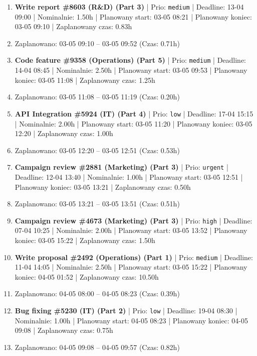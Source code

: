 {\begin{enumerate}
  \item [\textbf{14634}] \textbf{Write report \#8603 (R\&D) (Part 3)} | Prio: \texttt{medium} | Deadline: 13-04 09:00 | Nominalnie: 1.50h | Planowany start: 03-05 08:21 | Planowany koniec: 03-05 09:10 | Zaplanowany czas: 0.83h
  \item [\textbf{PRZERWA}] Zaplanowano: 03-05 09:10 -- 03-05 09:52 (Czas: 0.71h)
  \item [\textbf{14661}] \textbf{Code feature \#9358 (Operations) (Part 5)} | Prio: \texttt{medium} | Deadline: 14-04 08:45 | Nominalnie: 2.50h | Planowany start: 03-05 09:53 | Planowany koniec: 03-05 11:08 | Zaplanowany czas: 1.25h
  \item [\textbf{PRZERWA}] Zaplanowano: 03-05 11:08 -- 03-05 11:19 (Czas: 0.20h)
  \item [\textbf{14696}] \textbf{API Integration \#5924 (IT) (Part 4)} | Prio: \texttt{low} | Deadline: 17-04 15:15 | Nominalnie: 2.00h | Planowany start: 03-05 11:20 | Planowany koniec: 03-05 12:20 | Zaplanowany czas: 1.00h
  \item [\textbf{PRZERWA}] Zaplanowano: 03-05 12:20 -- 03-05 12:51 (Czas: 0.53h)
  \item [\textbf{14599}] \textbf{Campaign review \#2881 (Marketing) (Part 3)} | Prio: \texttt{urgent} | Deadline: 12-04 13:40 | Nominalnie: 1.00h | Planowany start: 03-05 12:51 | Planowany koniec: 03-05 13:21 | Zaplanowany czas: 0.50h
  \item [\textbf{PRZERWA}] Zaplanowano: 03-05 13:21 -- 03-05 13:51 (Czas: 0.51h)
  \item [\textbf{14625}] \textbf{Campaign review \#4673 (Marketing) (Part 3)} | Prio: \texttt{high} | Deadline: 07-04 10:25 | Nominalnie: 2.00h | Planowany start: 03-05 13:52 | Planowany koniec: 03-05 15:22 | Zaplanowany czas: 1.50h
  \item [\textbf{14668}] \textbf{Write proposal \#2492 (Operations) (Part 1)} | Prio: \texttt{medium} | Deadline: 11-04 14:05 | Nominalnie: 2.50h | Planowany start: 03-05 15:22 | Planowany koniec: 04-05 01:52 | Zaplanowany czas: 10.50h
  \item [\textbf{PRZERWA}] Zaplanowano: 04-05 08:00 -- 04-05 08:23 (Czas: 0.39h)
  \item [\textbf{14680}] \textbf{Bug fixing \#5230 (IT) (Part 2)} | Prio: \texttt{low} | Deadline: 19-04 08:30 | Nominalnie: 1.00h | Planowany start: 04-05 08:23 | Planowany koniec: 04-05 09:08 | Zaplanowany czas: 0.75h
  \item [\textbf{PRZERWA}] Zaplanowano: 04-05 09:08 -- 04-05 09:57 (Czas: 0.82h)

\end{enumerate}}
